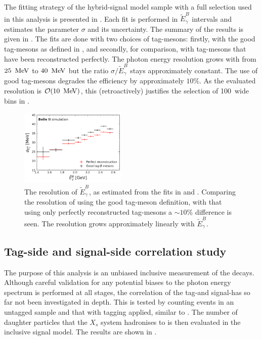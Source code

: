 The fitting strategy of the hybrid-signal model sample with a full selection used in this analysis is presented in .
Each fit is performed in $\tilde{E}_{\gamma}^{B}$ intervals and estimates the parameter $\sigma$ and its uncertainty.
The summary of the results is given in .
The fits are done with two choices of tag-\B mesons: firstly, with the good tag-\B mesons as defined in ,
and secondly, for comparison, with tag-\B mesons that have been reconstructed perfectly.
The photon energy resolution grows with \EB from $25~\mathrm{\,Me\kern -0.1em V}$ to $40~\mathrm{\,Me\kern -0.1em V}$
but the ratio $\sigma/\tilde{E}_{\gamma}^{B}$ stays approximately constant.
The use of good tag-\B mesons degrades the efficiency by approximately $10\%$.
As the evaluated resolution is ${\cal O}(10~\mathrm{\,Me\kern -0.1em V})$, this (retroactively) justifies the selection of 100~\mev wide bins in .

\begin{figure}[htbp!]
    \centering
    \includegraphics[width=0.45\textwidth]{figures/signal_validation/resolution_bin_by_bin_withkstar.pdf}
    \caption{\label{fig:resolution_sigmas} The resolution of $\tilde{E}_{\gamma}^{B}$, 
    as estimated from the fits in  and .
    Comparing the resolution of \EB using the good tag-\B meson definition, with that using only perfectly reconstructed tag-\B mesons a $\sim10\%$ difference is seen.
    The resolution grows approximately linearly with $\tilde{E}_{\gamma}^{B}$.
    }
\end{figure}

\subsection{Tag-side and signal-side correlation study}\label{sec:inclusivity_study}

The purpose of this analysis is an unbiased inclusive measurement of the \BtoXsgamma decays.
Although careful validation for any potential biases to the photon energy spectrum is performed at all stages,
the correlation of the tag-\B and signal-\B has so far not been investigated in depth.
This is tested by counting \BtoXsgamma events in an untagged sample and that with \FEI tagging applied, similar to .
The number of daughter particles that the $X_s$ system hadronises to is then evaluated in the inclusive \BtoXsgamma signal model.
The results are shown in .

